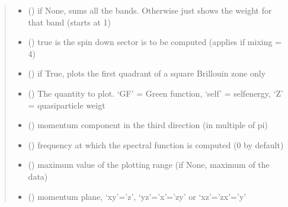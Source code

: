 \documentclass[letterpaper,10pt,english]{sphinxmanual}
\begin{document}
\begin{fulllineitems}
\begin{quote}
\begin{description}
\begin{itemize}
\item {} 
\sphinxAtStartPar
{} () \textendash{} if None, sums all the bands. Otherwise just shows the weight for that band (starts at 1)

\item {} 
\sphinxAtStartPar
{} () \textendash{} true is the spin down sector is to be computed (applies if mixing = 4)

\item {} 
\sphinxAtStartPar
{} () \textendash{} if True, plots the first quadrant of a square Brillouin zone only

\item {} 
\sphinxAtStartPar
{} () \textendash{} The quantity to plot. ‘GF’ = Green function, ‘self’ = self\sphinxhyphen{}energy, ‘Z’ = quasi\sphinxhyphen{}particle weigt

\item {} 
\sphinxAtStartPar
{} () \textendash{} momentum component in the third direction (in multiple of pi)

\item {} 
\sphinxAtStartPar
{} () \textendash{} frequency at which the spectral function is computed (0 by default)

\item {} 
\sphinxAtStartPar
{} () \textendash{} maximum value of the plotting range (if None, maximum of the data)

\item {} 
\sphinxAtStartPar
{} () \textendash{} momentum plane, ‘xy’=’z’, ‘yz’=’x’=’zy’ or ‘xz’=’zx’=’y’


\end{itemize}
\end{description}
\end{quote}
\end{fulllineitems}
\end{document}
